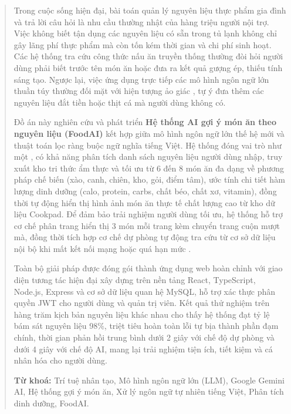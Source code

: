 \begin{abstract}

Trong cuộc sống hiện đại, bài toán quản lý nguyên liệu thực phẩm gia đình và trả lời câu hỏi  là nhu cầu thường nhật của hàng triệu người nội trợ. Việc không biết tận dụng các nguyên liệu có sẵn trong tủ lạnh không chỉ gây lãng phí thực phẩm mà còn tốn kém thời gian và chi phí sinh hoạt. Các hệ thống tra cứu công thức nấu ăn truyền thống thường đòi hỏi người dùng phải biết trước tên món ăn hoặc đưa ra kết quả gượng ép, thiếu tính sáng tạo. Ngược lại, việc ứng dụng trực tiếp các mô hình ngôn ngữ lớn  thuần túy thường đối mặt với hiện tượng ảo giác , tự ý đưa thêm các nguyên liệu đắt tiền hoặc thịt cá mà người dùng không có.

Đồ án này nghiên cứu và phát triển \textbf{Hệ thống AI gợi ý món ăn theo nguyên liệu (FoodAI)} kết hợp giữa mô hình ngôn ngữ lớn thế hệ mới  và thuật toán lọc ràng buộc ngữ nghĩa  tiếng Việt. Hệ thống đóng vai trò như một , có khả năng phân tích danh sách nguyên liệu người dùng nhập, truy xuất kho tri thức ẩm thực và tối ưu từ 6 đến 8 món ăn đa dạng về phương pháp chế biến (xào, canh, chiên, kho, gỏi, điểm tâm), ước tính chi tiết hàm lượng dinh dưỡng (calo, protein, carbs, chất béo, chất xơ, vitamin), đồng thời tự động hiển thị hình ảnh món ăn thực tế chất lượng cao từ kho dữ liệu Cookpad. Để đảm bảo trải nghiệm người dùng tối ưu, hệ thống hỗ trợ cơ chế phân trang hiển thị 3 món mỗi trang kèm chuyển trang cuộn mượt mà, đồng thời tích hợp cơ chế dự phòng  tự động tra cứu từ cơ sở dữ liệu nội bộ khi mất kết nối mạng hoặc quá hạn mức .

Toàn bộ giải pháp được đóng gói thành ứng dụng web hoàn chỉnh với giao diện tương tác hiện đại xây dựng trên nền tảng React, TypeScript, Node.js, Express và cơ sở dữ liệu quan hệ MySQL, hỗ trợ xác thực phân quyền JWT cho người dùng và quản trị viên. Kết quả thử nghiệm trên hàng trăm kịch bản nguyên liệu khác nhau cho thấy hệ thống đạt tỷ lệ bám sát nguyên liệu 98\%, triệt tiêu hoàn toàn lỗi tự bịa thành phần đạm chính, thời gian phản hồi trung bình dưới 2 giây với chế độ dự phòng và dưới 4 giây với chế độ AI, mang lại trải nghiệm tiện ích, tiết kiệm và cá nhân hóa cho người dùng.

\vspace{0.8em}
\noindent\textbf{Từ khoá:} Trí tuệ nhân tạo, Mô hình ngôn ngữ lớn (LLM), Google Gemini AI, Hệ thống gợi ý món ăn, Xử lý ngôn ngữ tự nhiên tiếng Việt, Phân tích dinh dưỡng, FoodAI.

\end{abstract}
